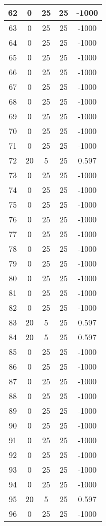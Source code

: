 \documentclass[letterpaper, 12pt]{article}
\begin{document}
\begin{longtable}{|c|c|c|c|c|}
\hline
62 & 0 & 25 & 25 & -1000 \\
\hline
63 & 0 & 25 & 25 & -1000 \\
\hline
64 & 0 & 25 & 25 & -1000 \\
\hline
65 & 0 & 25 & 25 & -1000 \\
\hline
66 & 0 & 25 & 25 & -1000 \\
\hline
67 & 0 & 25 & 25 & -1000 \\
\hline
68 & 0 & 25 & 25 & -1000 \\
\hline
69 & 0 & 25 & 25 & -1000 \\
\hline
70 & 0 & 25 & 25 & -1000 \\
\hline
71 & 0 & 25 & 25 & -1000 \\
\hline
72 & 20 & 5 & 25 & 0.597 \\
\hline
73 & 0 & 25 & 25 & -1000 \\
\hline
74 & 0 & 25 & 25 & -1000 \\
\hline
75 & 0 & 25 & 25 & -1000 \\
\hline
76 & 0 & 25 & 25 & -1000 \\
\hline
77 & 0 & 25 & 25 & -1000 \\
\hline
78 & 0 & 25 & 25 & -1000 \\
\hline
79 & 0 & 25 & 25 & -1000 \\
\hline
80 & 0 & 25 & 25 & -1000 \\
\hline
81 & 0 & 25 & 25 & -1000 \\
\hline
82 & 0 & 25 & 25 & -1000 \\
\hline
83 & 20 & 5 & 25 & 0.597 \\
\hline
84 & 20 & 5 & 25 & 0.597 \\
\hline
85 & 0 & 25 & 25 & -1000 \\
\hline
86 & 0 & 25 & 25 & -1000 \\
\hline
87 & 0 & 25 & 25 & -1000 \\
\hline
88 & 0 & 25 & 25 & -1000 \\
\hline
89 & 0 & 25 & 25 & -1000 \\
\hline
90 & 0 & 25 & 25 & -1000 \\
\hline
91 & 0 & 25 & 25 & -1000 \\
\hline
92 & 0 & 25 & 25 & -1000 \\
\hline
93 & 0 & 25 & 25 & -1000 \\
\hline
94 & 0 & 25 & 25 & -1000 \\
\hline
95 & 20 & 5 & 25 & 0.597 \\
\hline
96 & 0 & 25 & 25 & -1000 \\

\end{longtable}
\end{document}
